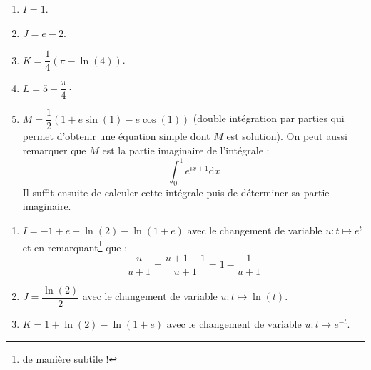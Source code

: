 \documentclass[a4paper,twoside,french,11pt]{VcCours}
\newcommand{\dx}{\text{d}x}
\begin{document}
\begin{Exercice}{}\end{Exercice}

\begin{enumerate}
\item $I= 1$.
\item $J= e-2$.
\item $K = \dfrac{1}{4} (\pi - \ln(4))$.
\item $L = 5- \dfrac{\pi}{4}\cdot$
\item $M = \dfrac{1}{2} (1+e \sin(1)-e \cos(1))$ (double intégration par parties qui permet d'obtenir une équation simple dont $M$ est solution). On peut aussi remarquer que $M$ est la partie imaginaire de l'intégrale :
$$ \int_{0}^{1} e^{ix+1} \dx$$
Il suffit ensuite de calculer cette intégrale puis de déterminer sa partie imaginaire.
\end{enumerate}



\begin{Exercice}{}\end{Exercice}

\begin{enumerate}
\item $I=   -1+e+ \ln(2)-\ln(1+e)$ avec le changement de variable $u : t \mapsto e^t$ et en remarquant\footnote{de manière subtile !} que :
$$ \frac{u}{u+1} = \frac{u+1-1}{u+1} = 1 - \frac{1}{u+1}$$
\item $J =   \dfrac{\ln(2)}{2}$ avec le changement de variable $u : t \mapsto \ln(t)$.
\item $K =   1+ \ln(2)-\ln(1+e)$ avec le changement de variable $u : t \mapsto e^{-t}$.
\end{enumerate}
\end{document}
